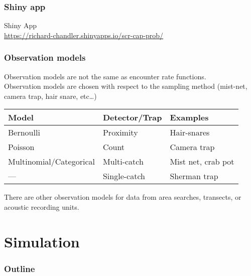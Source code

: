 \documentclass[color=usenames,dvipsnames]{beamer}\usepackage[]{graphicx}\usepackage[]{color}
\begin{document}
\begin{frame}
  \frametitle{Shiny app}
  \LARGE
  \centering
  Shiny App \\
  \normalsize
  \color{blue}
  \url{
    https://richard-chandler.shinyapps.io/scr-cap-prob/
  } \\
\end{frame}




\begin{frame}
  \frametitle{Observation models}
  Observation models are not the same as encounter rate functions. \\
  \pause \vfill
  Observation models are chosen with respect to the sampling
      method (mist-net, camera trap, hair snare, etc\dots) \\
  \pause \vfill
  \centering
    \begin{tabular}{lll}
      \hline
      Model       & Detector/Trap     & Examples           \\
      \hline
      Bernoulli   & Proximity    & Hair-snares        \\
      Poisson     & Count        & Camera trap        \\
      Multinomial/Categorical & Multi-catch  & Mist net, crab pot \\
      ---          & Single-catch & Sherman trap       \\
      \hline
    \end{tabular}
  \pause \vfill
  There are other observation models for data from area searches,
  transects, or acoustic recording units.
\end{frame}





\section{Simulation}


\begin{frame}
  \frametitle{Outline}
  \Large
  \tableofcontents[currentsection]
\end{frame}
\end{document}
